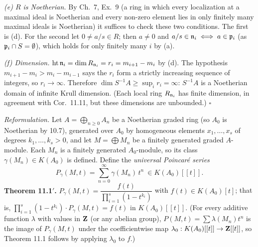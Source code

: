 \documentclass[11pt]{article}
\begin{document}
\emph{(e) $R$ is Noetherian.} By Ch.~7, Ex.~9 (a ring in which every localization at a maximal ideal is Noetherian and every non-zero element lies in only finitely many maximal ideals is Noetherian) it suffices to check these two conditions. The first is (d). For the second let $0\ne a/s\in R$; then $a\ne0$ and $a/s\in\mathfrak n_i\iff a\in\mathfrak p_i$ (as $\mathfrak p_i\cap S=\emptyset$), which holds for only finitely many $i$ by (a).

\emph{(f) Dimension.} $\operatorname{ht}\mathfrak n_i=\dim R_{\mathfrak n_i}=r_i=m_{i+1}-m_i$ by (d). The hypothesis $m_{i+1}-m_i>m_i-m_{i-1}$ says the $r_i$ form a strictly increasing sequence of integers, so $r_i\to\infty$. Therefore $\dim S^{-1}A\ge\sup_ir_i=\infty$: $S^{-1}A$ is a Noetherian domain of infinite Krull dimension. (Each local ring $R_{\mathfrak n_i}$ has finite dimension, in agreement with Cor.~11.11, but these dimensions are unbounded.) \hfill$\square$

\pf
\emph{Reformulation.} Let $A=\bigoplus_{n\ge0}A_n$ be a Noetherian graded ring (so $A_0$ is Noetherian by 10.7), generated over $A_0$ by homogeneous elements $x_1,\dots,x_s$ of degrees $k_1,\dots,k_s>0$, and let $M=\bigoplus M_n$ be a finitely generated graded $A$-module. Each $M_n$ is a finitely generated $A_0$-module, so its class $\gamma(M_n)\in K(A_0)$ is defined. Define the \emph{universal Poincaré series}
\[
P_\gamma(M,t)=\sum_{n=0}^\infty\gamma(M_n)\,t^n\ \in K(A_0)[[t]].
\]
\textbf{Theorem 11.1$'$.} $P_\gamma(M,t)=\dfrac{f(t)}{\prod_{i=1}^s(1-t^{k_i})}$ with $f(t)\in K(A_0)[t]$; that is, $\prod_{i=1}^s(1-t^{k_i})\cdot P_\gamma(M,t)=f(t)$ in $K(A_0)[[t]]$. \qquad (For every additive function $\lambda$ with values in $\mathbf Z$ (or any abelian group), $P(M,t)=\sum\lambda(M_n)t^n$ is the image of $P_\gamma(M,t)$ under the coefficientwise map $\lambda_0:K(A_0)[[t]]\to\mathbf Z[[t]]$, so Theorem 11.1 follows by applying $\lambda_0$ to $f$.)
\end{document}
